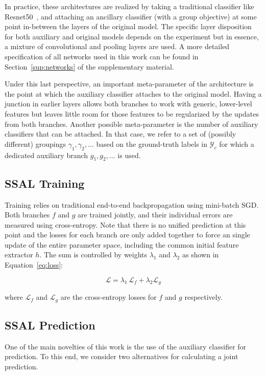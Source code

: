 \documentclass[10pt,twocolumn,letterpaper]{article}
\begin{document}
In practice, these architectures are realized by taking a traditional classifier like Resnet50~\cite{he2016deep}, and attaching an ancillary classifier (with a group objective) at some point in-between the layers of the original model.
The specific layer disposition for both auxiliary and original models depends on the experiment but in essence, a mixture of convolutional and pooling layers are used.
A more detailed specification of all networks used in this work can be found in Section~\ref{sup:networks} of the supplementary material.

Under this last perspective, an important meta-parameter of the architecture is the point at which the auxiliary classifier attaches to the original model.
Having a junction in earlier layers allows both branches to work with generic, lower-level features but leaves little room for those features to be regularized by the updates from both branches.
Another possible meta-parameter is the number of auxiliary classifiers that can be attached.
In that case, we refer to a set of (possibly different) groupings $\gamma_1, \gamma_2, \dots$ based on the ground-truth labels in $\mathcal{Y}_c$ for which a dedicated auxiliary branch $g_1, g_2, \dots$ is used.

\subsection{SSAL Training}
Training relies on traditional end-to-end backpropagation using mini-batch SGD.
Both branches $f$ and $g$ are trained jointly, and their individual errors are measured using cross-entropy.
Note that there is no unified prediction at this point and the losses for each branch are only added together to force an single update of the entire parameter space, including the common initial feature extractor $h$.
The sum is controlled by weights $\lambda_1$ and $\lambda_2$ as shown in Equation~\ref{eq:loss}:

\begin{equation}
\mathcal{L} = \lambda_1\, \mathcal{L}_f + \lambda_2 \mathcal{L}_g
\label{eq:loss}
\end{equation}

where $\mathcal{L}_f$ and $\mathcal{L}_g$ are the cross-entropy losses for $f$ and $g$ respectively.

\subsection{SSAL Prediction}
\label{subsec:prediction}
One of the main novelties of this work is the use of the auxiliary classifier for prediction.
To this end, we consider two alternatives for calculating a joint prediction.
\end{document}
